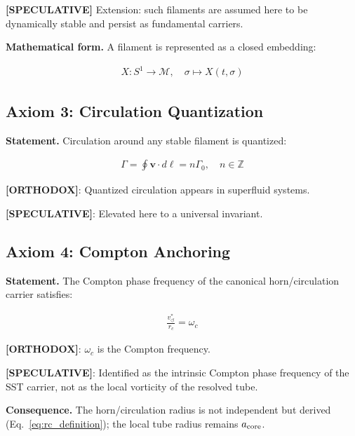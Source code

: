 \documentclass[11pt]{article}
\theoremstyle{definition}
\theoremstyle{plain}
\theoremstyle{remark}
\newcommand{\rc}{{r_c}}
\newcommand{\vchar}{v_{\!\boldsymbol{\circlearrowleft}}^{\ast}}
\begin{document}
        \textbf{[SPECULATIVE]} Extension: such filaments are assumed here to be dynamically stable and persist as fundamental carriers.
        
        \textbf{Mathematical form.}
        A filament is represented as a closed embedding:
        
        \begin{align}
            X: S^1 \to \mathcal{M}, \quad \sigma \mapsto X(t,\sigma)
        \end{align}
    
    \subsection{Axiom 3: Circulation Quantization}
        
        \textbf{Statement.}
        Circulation around any stable filament is quantized:
        
        \begin{align}
            \Gamma = \oint \mathbf{v} \cdot d\ell = n \Gamma_0, \quad n \in \mathbb{Z}
        \end{align}
        
        \textbf{[ORTHODOX]}: Quantized circulation appears in superfluid systems.
        
        \textbf{[SPECULATIVE]}: Elevated here to a universal invariant.
    
    \subsection{Axiom 4: Compton Anchoring}
        
        \textbf{Statement.}
        The Compton phase frequency of the canonical horn/circulation carrier satisfies:
        
        \begin{align}
            \frac{\vchar}{\rc} = \omega_c
        \end{align}
        
        \textbf{[ORTHODOX]}: $\omega_c$ is the Compton frequency.
        
        \textbf{[SPECULATIVE]}: Identified as the intrinsic Compton phase frequency of the SST carrier, not as the local vorticity of the resolved tube.
        
        \textbf{Consequence.}
        The horn/circulation radius is not independent but derived (Eq.~\ref{eq:rc_definition}); the local tube radius remains $a_{\rm core}$.
    
\end{document}
